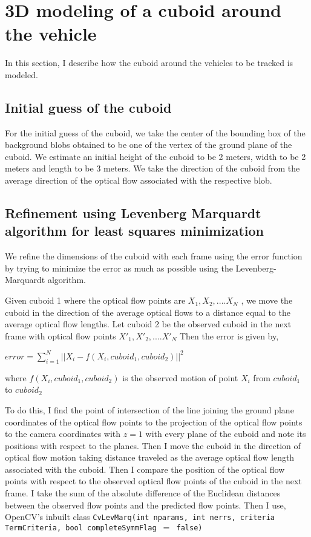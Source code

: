 \documentclass[a4paper]{aitthesis}
\begin{document}
\section{3D modeling of a cuboid around the vehicle}

In this section, I describe how the cuboid around the vehicles to be tracked is modeled.

\subsection{Initial guess of the cuboid}
For the initial guess of the cuboid, we take the center of the bounding box of the background blobs obtained to be one of the vertex of the ground plane of the cuboid. We estimate an initial height of the cuboid to be 2 meters, width to be 2 meters and length to be 3 meters. We take the direction of the cuboid from the average direction of the optical flow associated with the respective blob.

\subsection{Refinement using Levenberg Marquardt algorithm for least squares minimization}

We refine the dimensions of the cuboid with each frame using the error function by trying to minimize the error as much as possible using the Levenberg-Marquardt algorithm.

Given cuboid 1 where the optical flow points  are $X_1, X_2, .... X_N$ , we move the cuboid in the direction of the average optical flows to a distance equal to the average optical flow lengths. Let cuboid 2 be the observed cuboid in the next frame with optical flow points $X'_1, X'_2, .... X'_N$
Then the error is given by, \newline
\begin{center}
\large \textbf{$error = \displaystyle\sum_{i=1}^{N} || X_i - f(X_i, cuboid_1, cuboid_2)|| ^{2}$}
\end{center}
where $f(X_i, cuboid_1, cuboid_2)$  is the observed motion of point $X_i$ from $cuboid_1$ to $cuboid_2$ \newline

To do this, I find the point of intersection of the line joining the ground plane coordinates of the optical flow points to the projection of the optical flow points to the camera coordinates with $z = 1$ with every plane of the cuboid and note its positions with respect to the planes. Then I move the cuboid in the direction of optical flow motion taking distance traveled as the average optical flow length associated with the cuboid. Then I compare the position of the optical flow points with respect to the observed optical flow points of the cuboid in the next frame. I take the sum of the absolute difference of the Euclidean distances between the observed flow points and the predicted flow points. Then I use, OpenCV's inbuilt class \texttt{CvLevMarq(int nparams, int nerrs, criteria TermCriteria, bool completeSymmFlag $=$ false)} 
\end{document}
